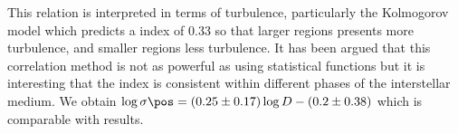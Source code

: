 This relation is interpreted in terms of turbulence, particularly the Kolmogorov model which predicts a index of \num{0.33} so that larger regions presents more turbulence, and smaller regions less turbulence.
It has been argued that this correlation method is not as powerful as using statistical functions \citep{1984ApJ...277..556S} but it is interesting that the index is consistent within different phases of the interstellar medium.
We obtain \(\log \sigma\pos = (0.25 \pm 0.17) \log D - (0.2 \pm 0.38)\) which is comparable with \citet{1981MNRAS.194..809L} results.


